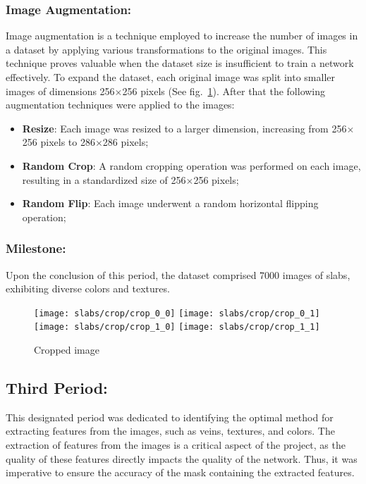 \subsubsection{Image Augmentation:}
Image augmentation is a technique employed to increase the number of images in a dataset by applying various transformations to the original images. 
This technique proves valuable when the dataset size is insufficient to train a network effectively.
To expand the dataset, each original image was split into smaller images of dimensions 256$\times$256 pixels (See fig.~\ref{fig:slab-split}).
After that the following augmentation techniques were applied to the images:
\begin{itemize}
    \item  \textbf{Resize}: Each image was resized to a larger dimension, increasing from 256$\times$256 pixels to 286$\times$286 pixels;
    \item  \textbf{Random Crop}: A random cropping operation was performed on each image, resulting in a standardized size of 256$\times$256 pixels;
    \item  \textbf{Random Flip}: Each image underwent a random horizontal flipping operation;
\end{itemize}
\subsubsection{Milestone:}
Upon the conclusion of this period, the dataset comprised 7000 images of slabs, exhibiting diverse colors and textures.

\begin{figure}
    \centering
    \texttt{[image: slabs/crop/crop\_0\_0]}
    \texttt{[image: slabs/crop/crop\_0\_1]}\\
    \vspace{0.1cm}
    \texttt{[image: slabs/crop/crop\_1\_0]}
    \texttt{[image: slabs/crop/crop\_1\_1]}
    \caption{Cropped image}\label{fig:slab-split}
\end{figure}

\subsection{Third Period:}
This designated period was dedicated to identifying the optimal method for extracting features from the images, such as veins, textures, and colors. 
The extraction of features from the images is a critical aspect of the project, as the quality of these features directly impacts the quality of the network. 
Thus, it was imperative to ensure the accuracy of the mask containing the extracted features.

